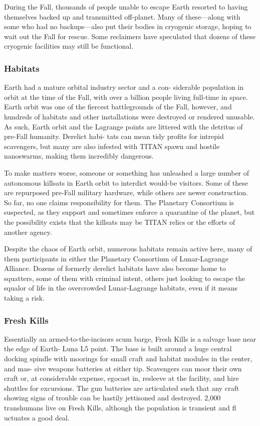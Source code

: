 During the Fall, thousands of people unable to 
escape Earth resorted to having themselves backed 
up and transmitted off-planet. Many of these—along 
with some who had no backups—also put their bodies 
in cryogenic storage, hoping to wait out the Fall for 
rescue. Some reclaimers have speculated that dozens 
of these cryogenic facilities may still be functional.

\subsubsection{Habitats}

Earth had a mature orbital industry sector and a con-
siderable population in orbit at the time of the Fall, 
with over a billion people living full-time in space. 
Earth orbit was one of the fiercest battlegrounds of 
the Fall, however, and hundreds of habitats and other 
installations were destroyed or rendered unusable. As 
such, Earth orbit and the Lagrange points are littered 
with the detritus of pre-Fall humanity. Derelict habi-
tats can mean tidy profits for intrepid scavengers, but 
many are also infested with TITAN spawn and hostile 
nanoswarms, making them incredibly dangerous.

To make matters worse, someone or something has 
unleashed a large number of autonomous killsats in 
Earth orbit to interdict would-be visitors. Some of 
these are repurposed pre-Fall military hardware, while 
others are newer construction. So far, no one claims 
responsibility for them. The Planetary Consortium 
is suspected, as they support and sometimes enforce 
a quarantine of the planet, but the possibility exists 
that the killsats may be TITAN relics or the efforts of 
another agency.

Despite the chaos of Earth orbit, numerous habitats 
remain active here, many of them participants in either 
the Planetary Consortium of Lunar-Lagrange Alliance. 
Dozens of formerly derelict habitats have also become 
home to squatters, some of them with criminal intent, 
others just looking to escape the squalor of life in 
the overcrowded Lunar-Lagrange habitats, even if it 
means taking a risk.

\subsubsection{Fresh Kills}

Essentially an armed-to-the-incisors scum barge, 
Fresh Kills is a salvage base near the edge of Earth-
Luna L5 point. The base is built around a huge 
central docking spindle with moorings for small 
craft and habitat modules in the center, and mas-
sive weapons batteries at either tip. Scavengers can 
moor their own craft or, at considerable expense, 
egocast in, resleeve at the facility, and hire shuttles 
for excursions. The gun batteries are articulated such 
that any craft showing signs of trouble can be hastily 
jettisoned and destroyed. 2,000 transhumans live on 
Fresh Kills, although the population is transient and 
fl uctuates a good deal.


